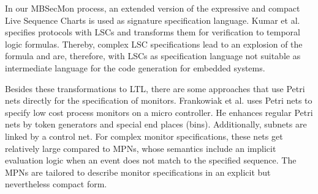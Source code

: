 

In our MBSecMon process, an extended version of the expressive and compact Live Sequence Charts is used as signature specification language. 
Kumar et al. \cite{Kumar2009} specifies protocols with LSCs and transforms them for verification to temporal logic formulas. 
Thereby, complex LSC specifications lead to an explosion of the formula and are, therefore, with LSCs as specification language not suitable as intermediate language for the code generation for embedded systems.

Besides these transformations to LTL, there are some approaches that use Petri nets directly for the specification of monitors.
Frankowiak et al. \cite{Frankowiak2009} uses Petri nets to specify low cost process monitors on a micro controller.
He enhances regular Petri nets by token generators and special end places (bins).
Additionally, subnets are linked by a control net.
For complex monitor specifications, these nets get relatively large compared to MPNs, whose semantics include an implicit evaluation logic when an event does not match to the specified sequence. 
The MPNs are tailored to describe monitor specifications in an explicit but nevertheless compact form.


